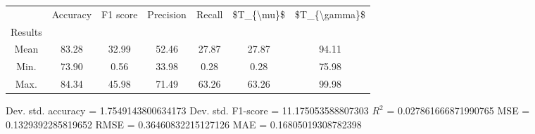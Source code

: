 \begin{tabular}{|c|c|c|c|c|c|c|}
\toprule
{} &  Accuracy &  F1 score &  Precision &  Recall &  \$T\_\{\textbackslash mu\}\$ &  \$T\_\{\textbackslash gamma\}\$ \\
Results &           &           &            &         &            &               \\
\hline
Mean    &     83.28 &     32.99 &      52.46 &   27.87 &      27.87 &         94.11 \\
Min.    &     73.90 &      0.56 &      33.98 &    0.28 &       0.28 &         75.98 \\
Max.    &     84.34 &     45.98 &      71.49 &   63.26 &      63.26 &         99.98 \\
\bottomrule
\end{tabular}

 Dev. std. accuracy = 1.7549143800634173
 Dev. std. F1-score = 11.175053588807303
 $R^2$ = 0.027861666871990765
 MSE = 0.1329392285819652
 RMSE = 0.36460832215127126
 MAE = 0.16805019308782398